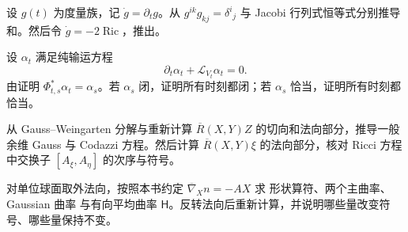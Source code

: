 \begin{exercise}
设 \(g(t)\) 为度量族，记 \(\dot g=\partial_tg\)。从 \(g^{ik}g_{kj}=\delta^i{}_j\) 与 Jacobi 行列式恒等式分别推导和。然后令 \(\dot g=-2\operatorname{Ric}\)，推出。
\end{exercise}

\begin{exercise}
设 \(\alpha_t\) 满足纯输运方程
\[
\partial_t\alpha_t+\mathcal L_{V_t}\alpha_t=0.
\]
由证明 \(\Phi_{t,s}^*\alpha_t=\alpha_s\)。若 \(\alpha_s\) 闭，证明所有时刻都闭；若 \(\alpha_s\) 恰当，证明所有时刻都恰当。
\end{exercise}

\begin{exercise}
从 Gauss--Weingarten 分解与重新计算 \(\overline R(X,Y)Z\) 的切向和法向部分，推导一般余维 Gauss 与 Codazzi 方程。然后计算 \(\overline R(X,Y)\xi\) 的法向部分，核对 Ricci 方程中交换子 \([A_\xi,A_\eta]\) 的次序与符号。
\end{exercise}

\begin{exercise}
对单位球面取外法向，按照本书约定 \(\overline\nabla_Xn=-AX\) 求 形状算符、两个主曲率、Gaussian 曲率 与有向平均曲率 \(\mathsf H\)。反转法向后重新计算，并说明哪些量改变符号、哪些量保持不变。
\end{exercise}

